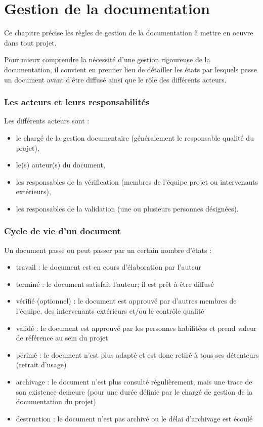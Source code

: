 \part{Gestion de la documentation}

Ce chapitre précise les règles de gestion de la documentation à mettre en oeuvre dans tout projet.

Pour mieux comprendre la nécessité d’une gestion rigoureuse de la documentation, il convient en premier lieu de détailler les états par lesquels passe un document avant d’être diffusé ainsi que le rôle des différents acteurs.

\section{Les acteurs et leurs responsabilités}

Les différents acteurs sont :

\begin{itemize}
\item le chargé de la gestion documentaire (généralement le responsable qualité du projet),
\item le(s) auteur(s) du document,
\item les responsables de la vérification (membres de l’équipe projet ou intervenants extérieurs),
\item les responsables de la validation (une ou plusieurs personnes désignées).
\end{itemize}


\section{Cycle de vie d'un document}

Un document passe ou peut passer par un certain nombre d'états :

\begin{itemize}
\item travail : le document est en cours d'élaboration par l'auteur
\item terminé : le document satisfait l'auteur; il est prêt à être diffusé
\item vérifié (optionnel) : le document est approuvé par d'autres membres de l'équipe, des intervenants extérieurs et/ou le contrôle qualité
\item validé : le document est approuvé par les personnes habilitées et prend valeur de référence au sein du projet
\item périmé : le document n’est plus adapté et est donc retiré à tous ses détenteurs (retrait d'usage)
\item archivage : le document n'est plus consulté régulièrement, mais une trace de son existence demeure (pour une durée définie par le chargé de gestion de la documentation du projet)
\item destruction : le document n'est pas archivé ou le délai d'archivage est écoulé
\end{itemize}

